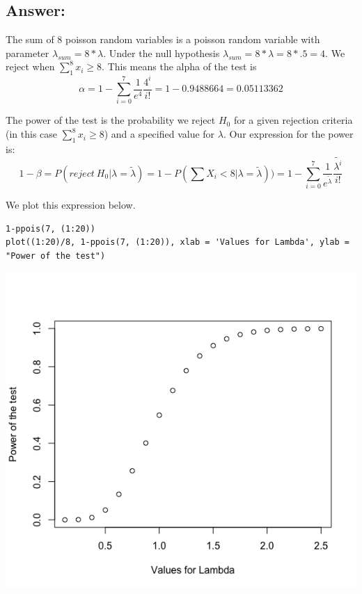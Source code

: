 \documentclass[svgnames]{article}
\begin{document}
\subsection*{Answer:}
The sum of 8 poisson random variables is a poisson random variable with parameter $\lambda_{sum} = 8* \lambda$. Under the null hypothesis $\lambda_{sum} = 8* \lambda = 8*.5=4$. We reject when $\sum_{1}^{8}x_i \geq 8$. This means the alpha of the test is 
$$\alpha = 1- \sum_{i=0}^{7}\frac{1}{e^{4}}\frac{4^i}{i!}=1-0.9488664=0.05113362$$

The power of the test is the probability we reject $H_0$ for a given rejection criteria (in this case $\sum_{1}^{8}x_i \geq 8$) and a specified value for $\lambda$.
\newline
Our expression for the power is:
$$1-\beta=P(reject\ H_0 | \lambda = \tilde{\lambda}) = 1 - P(\sum X_i < 8 | \lambda = \tilde{\lambda})) = 1- \sum_{i=0}^{7}\frac{1}{e^{\tilde{\lambda}}}\frac{\tilde{\lambda^i}}{i!}$$

We plot this expression below. 
\begin{lstlisting}
1-ppois(7, (1:20))
plot((1:20)/8, 1-ppois(7, (1:20)), xlab = 'Values for Lambda', ylab = "Power of the test")
\end{lstlisting}
\includegraphics[scale=.5]{powercurve}
\end{document}
